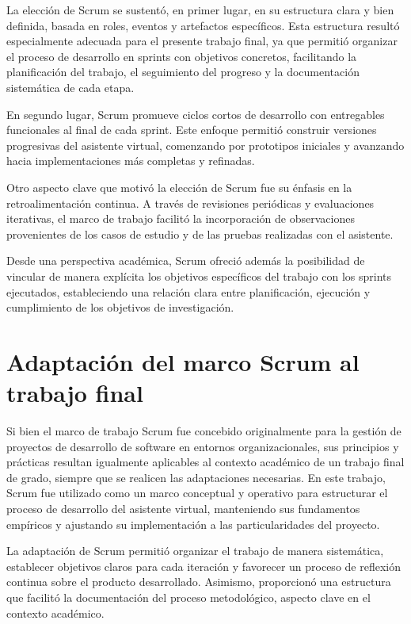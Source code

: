 La elección de Scrum se sustentó, en primer lugar, en su estructura clara y bien definida, basada en roles, eventos y artefactos específicos. Esta estructura resultó especialmente adecuada para el presente trabajo final, ya que permitió organizar el proceso de desarrollo en sprints con objetivos concretos, facilitando la planificación del trabajo, el seguimiento del progreso y la documentación sistemática de cada etapa.

En segundo lugar, Scrum promueve ciclos cortos de desarrollo con entregables funcionales al final de cada sprint. Este enfoque permitió construir versiones progresivas del asistente virtual, comenzando por prototipos iniciales y avanzando hacia implementaciones más completas y refinadas.

Otro aspecto clave que motivó la elección de Scrum fue su énfasis en la retroalimentación continua. A través de revisiones periódicas y evaluaciones iterativas, el marco de trabajo facilitó la incorporación de observaciones provenientes de los casos de estudio y de las pruebas realizadas con el asistente.

Desde una perspectiva académica, Scrum ofreció además la posibilidad de vincular de manera explícita los objetivos específicos del trabajo con los sprints ejecutados, estableciendo una relación clara entre planificación, ejecución y cumplimiento de los objetivos de investigación.

\section{Adaptación del marco Scrum al trabajo final}

Si bien el marco de trabajo Scrum fue concebido originalmente para la gestión de proyectos de desarrollo de software en entornos organizacionales, sus principios y prácticas resultan igualmente aplicables al contexto académico de un trabajo final de grado, siempre que se realicen las adaptaciones necesarias. En este trabajo, Scrum fue utilizado como un marco conceptual y operativo para estructurar el proceso de desarrollo del asistente virtual, manteniendo sus fundamentos empíricos y ajustando su implementación a las particularidades del proyecto.

La adaptación de Scrum permitió organizar el trabajo de manera sistemática, establecer objetivos claros para cada iteración y favorecer un proceso de reflexión continua sobre el producto desarrollado. Asimismo, proporcionó una estructura que facilitó la documentación del proceso metodológico, aspecto clave en el contexto académico.

